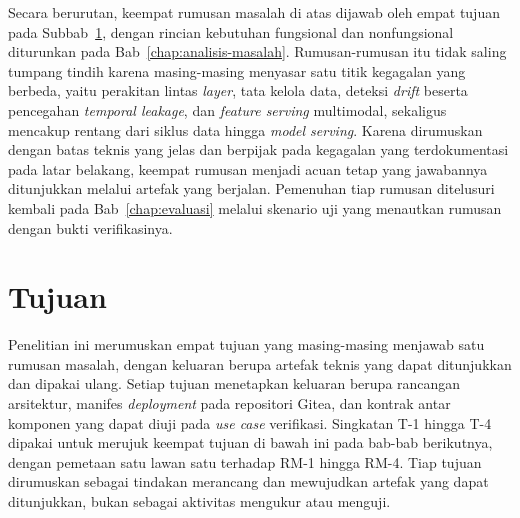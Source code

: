 Secara berurutan, keempat rumusan masalah di atas dijawab oleh empat tujuan pada Subbab~\ref{sec:tujuan}, dengan rincian kebutuhan fungsional dan nonfungsional diturunkan pada Bab~\ref{chap:analisis-masalah}. Rumusan-rumusan itu tidak saling tumpang tindih karena masing-masing menyasar satu titik kegagalan yang berbeda, yaitu perakitan lintas \textit{layer}, tata kelola data, deteksi \textit{drift} beserta pencegahan \textit{temporal leakage}, dan \textit{feature serving} multimodal, sekaligus mencakup rentang dari siklus data hingga \textit{model serving}. Karena dirumuskan dengan batas teknis yang jelas dan berpijak pada kegagalan yang terdokumentasi pada latar belakang, keempat rumusan menjadi acuan tetap yang jawabannya ditunjukkan melalui artefak yang berjalan. Pemenuhan tiap rumusan ditelusuri kembali pada Bab~\ref{chap:evaluasi} melalui skenario uji yang menautkan rumusan dengan bukti verifikasinya.

\section{Tujuan}
\label{sec:tujuan}

Penelitian ini merumuskan empat tujuan yang masing-masing menjawab satu rumusan masalah, dengan keluaran berupa artefak teknis yang dapat ditunjukkan dan dipakai ulang. Setiap tujuan menetapkan keluaran berupa rancangan arsitektur, manifes \textit{deployment} pada repositori Gitea, dan kontrak antar komponen yang dapat diuji pada \textit{use case} verifikasi. Singkatan T-1 hingga T-4 dipakai untuk merujuk keempat tujuan di bawah ini pada bab-bab berikutnya, dengan pemetaan satu lawan satu terhadap RM-1 hingga RM-4. Tiap tujuan dirumuskan sebagai tindakan merancang dan mewujudkan artefak yang dapat ditunjukkan, bukan sebagai aktivitas mengukur atau menguji.

